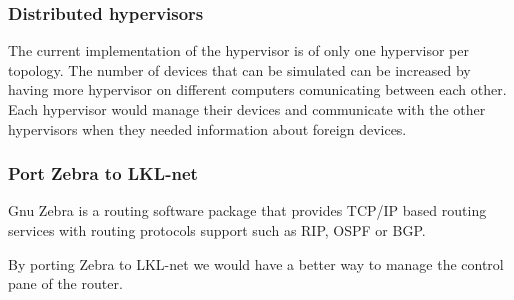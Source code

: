 \subsubsection{Distributed hypervisors}

The current implementation of the hypervisor is of only one hypervisor per topology. The number of devices that can be
simulated can be increased by having more hypervisor on different computers comunicating between each other. Each hypervisor 
would manage their devices and communicate with the other hypervisors when they needed information about foreign devices.

\subsubsection{Port Zebra to LKL-net}

Gnu Zebra is a routing software package that provides TCP/IP based routing services with routing protocols support such
as RIP, OSPF or BGP. 

By porting Zebra to LKL-net we would have a better way to manage the control pane of the router.